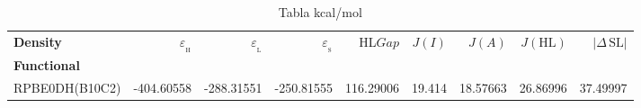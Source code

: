 \documentclass[preprint,landscape,12pt]{elsarticle}
\begin{document}
	\begin{table}
		\caption{ Tabla kcal/mol}
		\centering
		\footnotesize
		\begin{tabular}{lrrrrrrrr}
			\hline
			\textbf{Density}    & $\varepsilon_{_{\mathrm{H}}}$	& $\varepsilon_{_{\mathrm{L}}}$  & $\varepsilon_{_{\mathrm{S}}}$& HL$Gap$ & $J(I)$ & $J(A)$ & $J(\mathrm{HL})$  & \textbf{$\left|\Delta\,\mathrm{SL}\right|$}  \\
			\textbf{Functional} &   &  &     &   &  &  &  &  \\
			\hline \hline 

RPBE0DH(B10C2) & -404.60558 & -288.31551 & -250.81555 & 116.29006 & 19.414 & 18.57663 & 26.86996 & 37.49997\\

	 		\hline
		\end{tabular}
			\label{tab:kcal/mol}
	\end{table}
\end{document}
